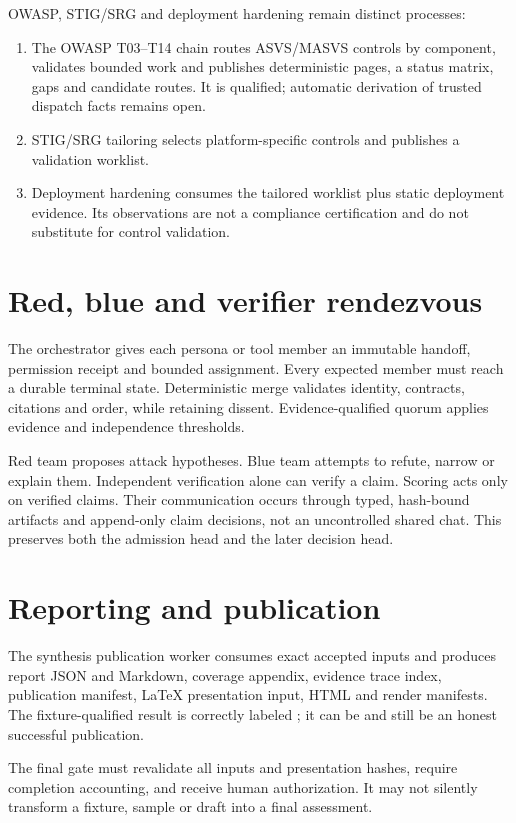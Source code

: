 \documentclass[10pt,a4paper]{article}
\begin{document}
OWASP, STIG/SRG and deployment hardening remain distinct processes:
\begin{enumerate}
\item The OWASP T03--T14 chain routes ASVS/MASVS controls by component, validates bounded work and
publishes deterministic pages, a status matrix, gaps and candidate routes. It is qualified; automatic
derivation of trusted dispatch facts remains open.
\item STIG/SRG tailoring selects platform-specific controls and publishes a validation worklist.
\item Deployment hardening consumes the tailored worklist plus static deployment evidence. Its
observations are not a compliance certification and do not substitute for control validation.
\end{enumerate}

\section{Red, blue and verifier rendezvous}
The orchestrator gives each persona or tool member an immutable handoff, permission receipt and
bounded assignment. Every expected member must reach a durable terminal state. Deterministic merge
validates identity, contracts, citations and order, while retaining dissent. Evidence-qualified
quorum applies evidence and independence thresholds.

Red team proposes attack hypotheses. Blue team attempts to refute, narrow or explain them.
Independent verification alone can verify a claim. Scoring acts only on verified claims. Their
communication occurs through typed, hash-bound artifacts and append-only claim decisions, not an
uncontrolled shared chat. This preserves both the admission head and the later decision head.

\section{Reporting and publication}
The synthesis publication worker consumes exact accepted inputs and produces report JSON and
Markdown, coverage appendix, evidence trace index, publication manifest, LaTeX presentation input,
HTML and render manifests. The fixture-qualified result is correctly labeled
; it can be  and still be an honest successful
publication.

The final gate must revalidate all inputs and presentation hashes, require completion accounting,
and receive human authorization. It may not silently transform a fixture, sample or draft into a
final assessment.
\end{document}
